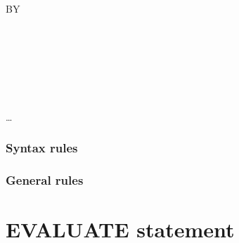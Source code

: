 \begin{syntax}[\miscextcolour]
  \begin{minipage}[!h]{1.0\linewidth}
    \begin{0-1}
      \mnemonicname
    \end{0-1}
    \literal

    \begin{0-1}

      \begin{1=}
        \begin{0-1}
          BY
          \begin{1=}
             \\
             \\
          \end{1=}
        \end{0-1}

        \begin{1=}
           \\

          \begin{1=}
            \begin{1=}
              \identifier \\
              \literal
            \end{1=}
          \end{1=}
        \end{1=}\ldots
      \end{1=}
    \end{0-1}
  \end{minipage}
\end{syntax}

\subsubsection{Syntax rules}

\subsubsection{General rules}

\section{EVALUATE statement}

